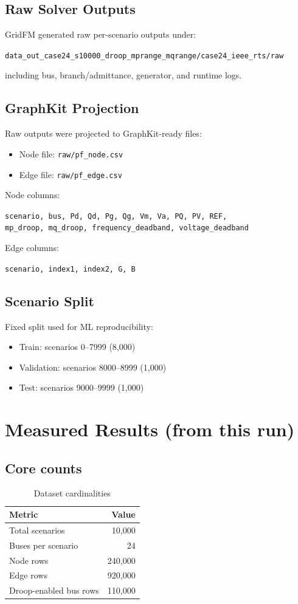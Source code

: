 ﻿\documentclass[11pt]{article}
\begin{document}
\subsection{Raw Solver Outputs}
GridFM generated raw per-scenario outputs under:
\begin{center}
\texttt{data\_out\_case24\_s10000\_droop\_mprange\_mqrange/case24\_ieee\_rts/raw}
\end{center}
including bus, branch/admittance, generator, and runtime logs.

\subsection{GraphKit Projection}
Raw outputs were projected to GraphKit-ready files:
\begin{itemize}
\item Node file: \texttt{raw/pf\_node.csv}
\item Edge file: \texttt{raw/pf\_edge.csv}
\end{itemize}

Node columns:
\begin{center}
\texttt{scenario, bus, Pd, Qd, Pg, Qg, Vm, Va, PQ, PV, REF,} \\
\texttt{mp\_droop, mq\_droop, frequency\_deadband, voltage\_deadband}
\end{center}

Edge columns:
\begin{center}
\texttt{scenario, index1, index2, G, B}
\end{center}

\subsection{Scenario Split}
Fixed split used for ML reproducibility:
\begin{itemize}
\item Train: scenarios 0--7999 (8,000)
\item Validation: scenarios 8000--8999 (1,000)
\item Test: scenarios 9000--9999 (1,000)
\end{itemize}

\section{Measured Results (from this run)}
\subsection{Core counts}
\begin{table}[H]
\centering
\caption{Dataset cardinalities}
\begin{tabular}{lr}
\toprule
Metric & Value \\
\midrule
Total scenarios & 10,000 \\
Buses per scenario & 24 \\
Node rows & 240,000 \\
Edge rows & 920,000 \\
Droop-enabled bus rows & 110,000 \\
\bottomrule
\end{tabular}
\end{table}
\end{document}
